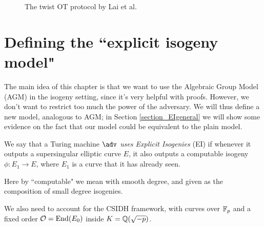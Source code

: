 \begin{figure}
    \caption{The twist OT protocol by Lai et al.}
    \label{prot_twist}
\end{figure}


\section{Defining the ``explicit isogeny model"}
The main idea of this chapter is that we want to use the Algebraic Group Model (AGM) in the isogeny setting, since it's very helpful with proofs. However, we don't want to restrict too much the power of the adversary. We will thus define a new model, analogous to AGM; in Section \ref{section_EIgeneral} we will show some evidence on the fact that our model could be equivalent to the plain model.

\begin{definition}
    We say that a Turing machine $\adv$ \emph{uses Explicit Isogenies} (EI) if whenever it outputs a supersingular elliptic curve $E$, it also outputs a computable isogeny $\phi:E_1\to E$, where $E_1$ is a curve that it has already seen.
\end{definition}

Here by ``computable" we mean with smooth degree, and given as the composition of small degree isogenies.

We also need to account for the CSIDH framework, with curves over $\mathbb{F}_p$ and a fixed order $\mathcal{O}=\operatorname{End}(E_0)$ inside $K=\mathbb{Q}(\sqrt{-p})$.


